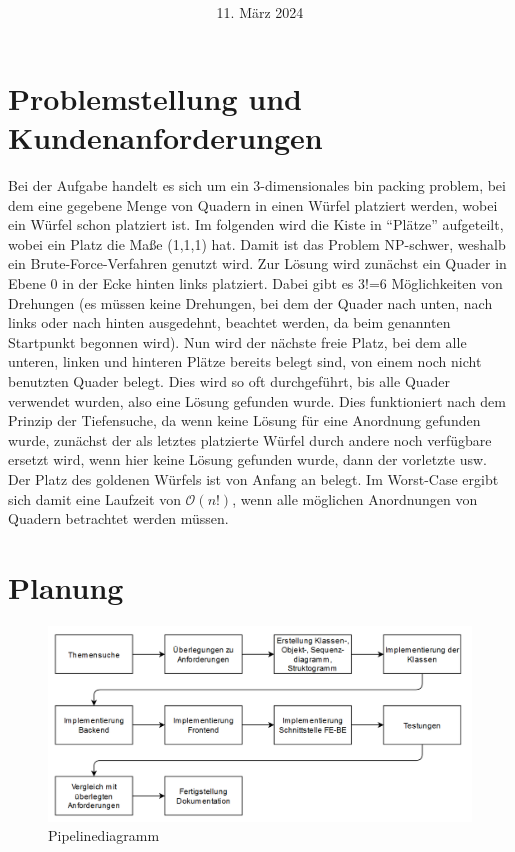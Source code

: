 \documentclass[a4paper,10pt,ngerman]{scrartcl}
\title{\textbf{\Huge\Aufgabe}}
\author{\LARGE \Namen\\\\}
\date{\LARGE11. März 2024}
\begin{document}
\maketitle
\tableofcontents

\vspace{0.5cm}


\section{Problemstellung und Kundenanforderungen}
Bei der Aufgabe handelt es sich um ein 3-dimensionales bin packing problem, bei dem eine gegebene Menge von Quadern in einen Würfel platziert werden, wobei ein Würfel schon platziert ist. Im folgenden wird die Kiste in “Plätze” aufgeteilt, wobei ein Platz die Maße (1,1,1) hat. Damit ist das Problem NP-schwer, weshalb ein Brute-Force-Verfahren genutzt wird. Zur Lösung wird zunächst ein Quader in Ebene 0 in der Ecke hinten links platziert. Dabei gibt es 3!=6 Möglichkeiten von Drehungen (es müssen keine Drehungen, bei dem der Quader nach unten, nach links oder nach hinten ausgedehnt,  beachtet werden, da beim genannten Startpunkt begonnen wird). Nun wird der nächste freie Platz, bei dem alle unteren, linken und hinteren Plätze bereits belegt sind, von einem noch nicht benutzten Quader belegt. Dies wird so oft durchgeführt, bis alle Quader verwendet wurden, also eine Lösung gefunden wurde. Dies funktioniert nach dem Prinzip der Tiefensuche, da wenn keine Lösung für eine Anordnung gefunden wurde, zunächst der als letztes platzierte Würfel durch andere noch verfügbare ersetzt wird, wenn hier keine Lösung gefunden wurde, dann der vorletzte usw. Der Platz des goldenen Würfels ist von Anfang an belegt. Im Worst-Case ergibt sich damit eine Laufzeit von $\mathcal{O}(n!)$, wenn alle möglichen Anordnungen von Quadern betrachtet werden müssen.

\newpage
\section{Planung}
\begin{figure}[!ht]
  \center
  \includegraphics[width=\textwidth]{Pipelinediagramm.png}
  \vspace{-.5cm}
  \caption{Pipelinediagramm}
\end{figure}
\end{document}
